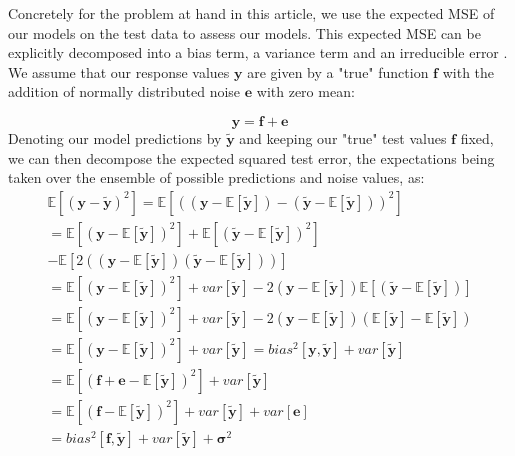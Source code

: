 \documentclass[reprint, english, nofootinbib]{revtex4-2}
\begin{document}
	Concretely for the problem at hand in this article, we use the expected MSE of our models on the test data to assess our models. This expected MSE can be explicitly decomposed into a bias term, a variance term and an irreducible error \cite{hastie}. We assume that our  response values $\pmb{y}$ are given by a "true" function $\pmb{f}$ with the addition of normally distributed noise $\pmb{e}$ with zero mean:
	
\begin{equation}
\label{model_assumption}
\pmb{y} = \pmb{f} + \pmb{e}
\end{equation}
	Denoting our model predictions by $\pmb{\tilde{y}}$ and keeping our "true" test values $\pmb{f}$ fixed,  we can then decompose the expected squared test error, the expectations being taken over the ensemble of possible predictions and noise values, as:
\begin{equation}
\label{bias_variance_decomp}
\begin{split}
\mathbb{E} [(\pmb{y} - \pmb{\tilde{y}})^2] = \mathbb{E} [((\pmb{y} - \mathbb{E}[\pmb{\tilde{y}}]) - (\pmb{\tilde{y}} - \mathbb{E}[\pmb{\tilde{y}}]))^2] \\
= \mathbb{E}[(\pmb{y} - \mathbb{E}[\pmb{\tilde{y}}])^2] + \mathbb{E}[(\pmb{\tilde{y}} - \mathbb{E}[\pmb{\tilde{y}}])^2] \\
- \mathbb{E} [ 2 ( (\pmb{y} - \mathbb{E}[\pmb{\tilde{y}}])(\pmb{\tilde{y}} - \mathbb{E}[\pmb{\tilde{y}}]))] \\
= \mathbb{E}[(\pmb{y} - \mathbb{E}[\pmb{\tilde{y}}])^2] + var[\pmb{\tilde{y}}] - 2(\pmb{y} - \mathbb{E}[\pmb{\tilde{y}}])\mathbb{E}[(\pmb{\tilde{y}} - \mathbb{E}[\pmb{\tilde{y}}])] \\
= \mathbb{E}[(\pmb{y} - \mathbb{E}[\pmb{\tilde{y}}])^2] + var[\pmb{\tilde{y}}] - 2(\pmb{y} - \mathbb{E}[\pmb{\tilde{y}}])(\mathbb{E}[\pmb{\tilde{y}}] - \mathbb{E}[\pmb{\tilde{y}}]) \\
= \mathbb{E}[(\pmb{y} - \mathbb{E}[\pmb{\tilde{y}}])^2] + var[\pmb{\tilde{y}}] = bias^2[\pmb{y},\pmb{\tilde{y}}] + var[\pmb{\tilde{y}}] \\
= \mathbb{E}[(\pmb{f} + \pmb{e} - \mathbb{E}[\pmb{\tilde{y}}])^2] + var[\pmb{\tilde{y}}] \\ = \mathbb{E}[(\pmb{f} - \mathbb{E}[\pmb{\tilde{y}}])^2] + var[\pmb{\tilde{y}}] + var[\pmb{e}] \\
= bias^2[\pmb{f},\pmb{\tilde{y}}] + var[\pmb{\tilde{y}}] + \pmb{\sigma}^2
\end{split}
\end{equation}
\end{document}
